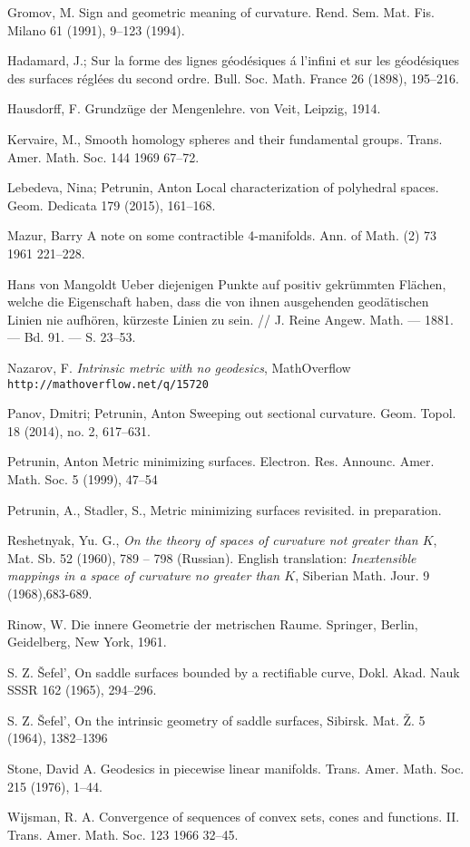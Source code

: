 \begin{thebibliography}{52}
Gromov, M.
Sign and geometric meaning of curvature. 
Rend. Sem. Mat. Fis. Milano 61 (1991), 9--123 (1994).

 Hadamard, J.;
Sur la forme des lignes g\'eod\'esiques \'a l'infini et sur les g\'eod\'esiques des surfaces r\'egl\'ees du second ordre.
Bull. Soc. Math. France 26 (1898), 195--216.

Hausdorff, F. 
Grundz\"uge der Mengenlehre.
von Veit, 
Leipzig, 
1914.

 Kervaire, M., 
Smooth homology spheres and their fundamental groups.
Trans. Amer. Math. Soc. 144 1969 67--72.

 Lebedeva, Nina; Petrunin, Anton Local characterization of polyhedral spaces. Geom. Dedicata 179 (2015), 161--168.

Mazur, Barry A note on some contractible 4-manifolds. Ann. of Math. (2) 73 1961 221--228.

Hans von Mangoldt Ueber diejenigen Punkte auf positiv gekr\"ummten Fl\"achen, welche die Eigenschaft haben, dass die von ihnen ausgehenden geod\"atischen Linien nie aufh\"oren, k\"urzeste Linien zu sein. // J. Reine Angew. Math. --- 1881. --- Bd. 91. --- S. 23--53.

Nazarov, F.
\textit{Intrinsic metric with no geodesics},
MathOverflow \texttt{http://mathoverflow.net/q/15720}

Panov, Dmitri; Petrunin, Anton
Sweeping out sectional curvature. 
Geom. Topol. 18 (2014), no. 2, 617--631. 

 Petrunin, Anton
Metric minimizing surfaces. 
Electron. Res. Announc. Amer. Math. Soc. 5 (1999), 47--54

  Petrunin, A., Stadler, S., 
Metric minimizing surfaces revisited. in preparation.

Reshetnyak, Yu. G.,
\textit{On the theory of spaces of curvature not greater than $K$},
 Mat. Sb. 52 (1960), 789 -- 798 (Russian).
English translation: \textit{Inextensible mappings in a space of curvature
no greater than $K$}, Siberian Math. Jour. 9 (1968),683-689.

Rinow, W. Die innere Geometrie der metrischen Raume. Springer, Berlin, Geidelberg, New York, 1961.

 S. Z. \v{S}efel', On saddle surfaces bounded by a rectifiable curve, Dokl. Akad. Nauk SSSR 162 (1965), 294--296.

 S. Z. \v{S}efel', On the intrinsic geometry of saddle surfaces, Sibirsk. Mat. \v{Z}. 5 (1964), 1382--1396

Stone, David A.
Geodesics in piecewise linear manifolds.
Trans. Amer. Math. Soc. 215 (1976), 1--44.

 Wijsman, R. A. Convergence of sequences of convex sets, cones and functions. II. Trans. Amer. Math. Soc. 123 1966 32--45.


\end{thebibliography}
